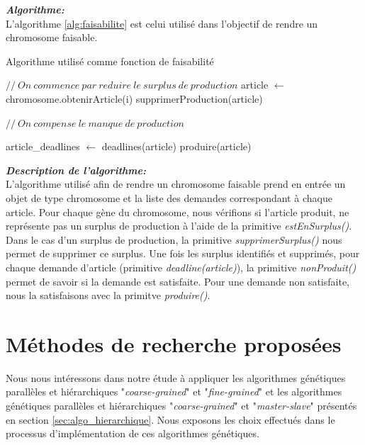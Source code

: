 	\hspace*{.5cm} \textbf{\textsl{Algorithme:}}\\	
	\hspace*{.5cm} L'algorithme \ref{alg:faisabilite} est celui utilisé dans l'objectif de rendre un chromosome faisable.
	\\
	\begin{algorithm}[H]
 		\caption{Algorithme utilisé comme fonction de faisabilité}
 		\label{alg:faisabilite}
 		\BlankLine
 		$//\ On\ commence\ par\ reduire\ le\ surplus\ de\ production$ \;
 		{
 			article $\gets$ chromosome.obtenirArticle(i) \;
 			{
 				supprimerProduction(article) \;
 			}
 		}
 		
 		$ //\ On\ compense\ le\ manque\ de\ production $ \;
 		
 		{
 			article\_deadlines $\gets$ deadlines(article) \;
 			{
 				{
 					produire(article)\;
 				}
 			}
 		}
 	
	\end{algorithm}
	
	\vspace*{.3cm}
	\hspace*{.5cm} \textbf{\textsl{Description de l'algorithme:}}\\
	\hspace*{.5cm} L'algorithme utilisé afin de rendre un chromosome faisable prend en entrée un objet de type chromosome et la liste des demandes correspondant à chaque article. Pour chaque gène du chromosome, nous vérifions si l'article produit, ne représente pas un surplus de production à l'aide de la primitive \emph{estEnSurplus()}. Dans le cas d'un surplus de production, la primitive \emph{supprimerSurplus()} nous permet de supprimer ce surplus. Une fois les surplus identifiés et supprimés, pour chaque demande d'article (primitive \emph{deadline(article)}), la primitive \emph{nonProduit()} permet de savoir si la demande est satisfaite. Pour une demande non satisfaite, nous la satisfaisons avec la primitve \emph{produire()}. 
	
	\section{Méthodes de recherche proposées}	
	
	Nous nous intéressons dans notre étude à appliquer les algorithmes génétiques parallèles et hiérarchiques "\emph{coarse-grained}" et "\emph{fine-grained}" et les algorithmes génétiques parallèles et hiérarchiques "\emph{coarse-grained}" et "\emph{master-slave}" présentés en section \ref{sec:algo_hierarchique}. Nous exposons les choix effectués dans le processus d'implémentation de ces algorithmes génétiques.
	
